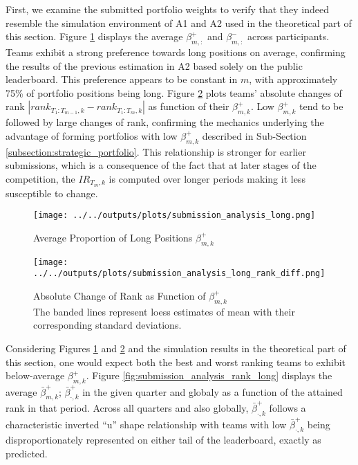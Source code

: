 \documentclass[3p,times,twocolumn]{elsarticle}
\begin{document}
First, we examine the submitted portfolio weights to verify that they indeed resemble the simulation environment of A1 and A2 used in the theoretical part of this section.
Figure \ref{fig:submission_analysis_long} displays the average $\beta^{+}_{m,:}$ and $\beta^{-}_{m,:}$ across participants.
Teams exhibit a strong preference towards long positions on average, confirming the results of the previous estimation in A2 based solely on the public leaderboard.
This preference appears to be constant in $m$, with approximately 75\% of portfolio positions being long.
Figure \ref{fig:submission_analysis_long_rank_diff} plots teams' absolute changes of rank $|rank_{T_{1}:T_{m-1},k} -rank_{T_{1}:T_{m},k}|$ as function of their $\beta^{+}_{m,k}$.
Low $\beta^{+}_{m,k}$ tend to be followed by large changes of rank, confirming the mechanics underlying the advantage of forming portfolios with low $\beta^{+}_{m,k}$ described in Sub-Section \ref{subsection:strategic_portfolio}.
This relationship is stronger for earlier submissions, which is a consequence of the fact that at later stages of the competition, the $IR_{T_{m},k}$ is computed over longer periods making it less susceptible to change.

\begin{figure}[!htbp]
    \centering
    \texttt{[image: ../../outputs/plots/submission\_analysis\_long.png]}
    \caption{Average Proportion of Long Positions $\beta_{m,k}^{+}$}
    \label{fig:submission_analysis_long}
\end{figure}

\begin{figure}[!htbp]
    \centering
    \texttt{[image: ../../outputs/plots/submission\_analysis\_long\_rank\_diff.png]}
    \caption{Absolute Change of Rank as Function of $\beta_{m,k}^{+}$\\
        The banded lines represent loess estimates of mean with their corresponding standard deviations.
    }
    \label{fig:submission_analysis_long_rank_diff}
\end{figure}

Considering Figures \ref{fig:submission_analysis_long} and \ref{fig:submission_analysis_long_rank_diff} and the simulation results in the theoretical part of this section, one would expect both the best and worst ranking teams to exhibit below-average $\beta^{+}_{m,k}$.
Figure \ref{fig:submission_analysis_rank_long} displays the average $\bar{\beta}^{+}_{m,k}$; $\bar{\beta}^{+}_{\cdot,k}$ in the given quarter and globaly as a function of the attained rank in that period.
Across all quarters and also globally, $\bar{\beta}^{+}_{\cdot,k}$ follows a characteristic inverted ``u'' shape relationship with teams with low $\bar{\beta}^{+}_{\cdot,k}$ being disproportionately represented on either tail of the leaderboard, exactly as predicted.
\end{document}
